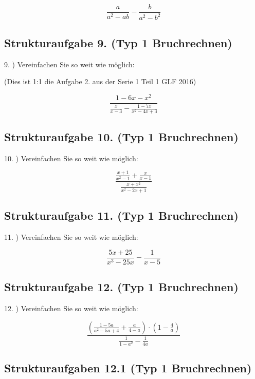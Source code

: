 {$$\frac{a}{a^2-ab} - \frac{b}{a^2-b^2}$$


\subsection*{Strukturaufgabe 9. (Typ 1 Bruchrechnen)}

9. ) Vereinfachen Sie so weit wie möglich:

(Dies ist 1:1 die Aufgabe 2. aus der Serie 1 Teil 1 GLF 2016)

$$\frac{1-6x-x^2}{\frac{x}{x-3} - \frac{1-7x}{x^2-4x+3}}$$



\subsection*{Strukturaufgabe 10. (Typ 1 Bruchrechnen)}

10. ) Vereinfachen Sie so weit wie möglich:

$$\frac{\frac{x+1}{x^2-1} + \frac{x}{x-1}}{\frac{x+x^2}{x^2-2x+1}}$$


\subsection*{Strukturaufgabe 11. (Typ 1 Bruchrechnen)}

11. ) Vereinfachen Sie so weit wie möglich:

$$\frac{5x+25}{x^3-25x} - \frac1{x-5}$$


\subsection*{Strukturaufgabe 12. (Typ 1 Bruchrechnen)}

12. ) Vereinfachen Sie so weit wie möglich:

$$\frac{\left( \frac{1-5a}{a^2-5a+4} + \frac{a}{4-a} \right)  \cdot{} \left( 1-\frac4a \right)}{\frac1{1-a^2} - \frac1{4a}}$$


\newpage
\subsection*{Strukturaufgaben 12.1 (Typ 1 Bruchrechnen)}


}
